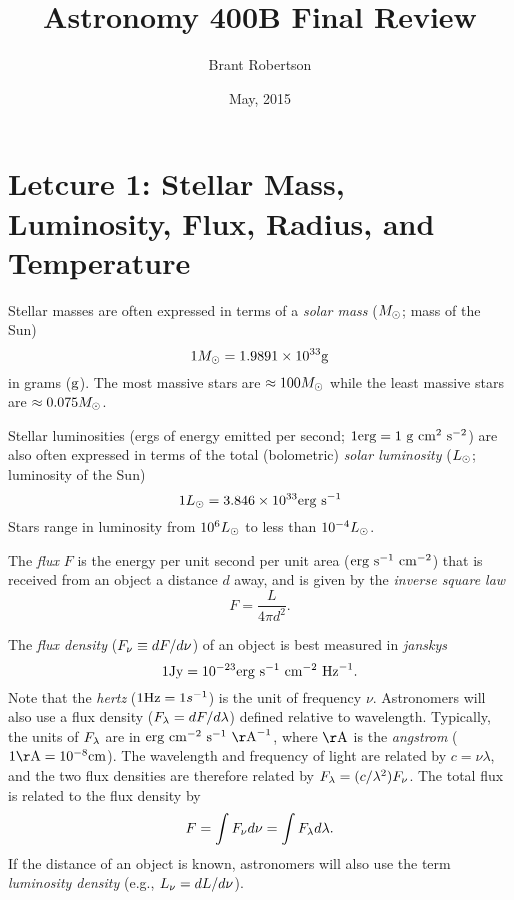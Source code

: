 \documentclass[]{article}
\title{Astronomy 400B Final Review}
\author{Brant Robertson}
\date{May, 2015}
\begin{document}
\maketitle

\section{Letcure 1: Stellar Mass, Luminosity, Flux, Radius, and Temperature}
Stellar masses are often expressed in terms of a {\it solar mass} ($M_{\odot}$; mass of the Sun)
\begin{equation}
1M_{\odot} = 1.9891\times10^{33}\mathrm{g}
\end{equation}
\noindent
in grams ($\mathrm{g}$). The most massive stars are $\approx100M_{\odot}$ while the
least massive stars are $\approx0.075M_{\odot}$.

Stellar luminosities (ergs of energy emitted per second; $1\mathrm{erg} = 1~\mathrm{g}~\mathrm{cm}^{2}~\mathrm{s}^{-2}$) are also 
often expressed in terms of the total (bolometric) {\it solar luminosity} ($L_{\odot}$; luminosity of the Sun)
\begin{equation}
1L_{\odot} = 3.846\times10^{33} \mathrm{erg}~\mathrm{s}^{-1}
\end{equation}
\noindent
Stars range in luminosity from $10^{6}L_{\odot}$ to less than $10^{-4}L_{\odot}$.

The {\it flux} $F$ is the energy per unit second per unit area ($\mathrm{erg}~\mathrm{s}^{-1}~\mathrm{cm}^{-2}$)
that is received from an object a distance $d$ away, and is
given by the {\it inverse square law}
\begin{equation}
\label{eqn:inverse_square}
F = \frac{L}{4\pi d^{2}}.
\end{equation}
\noindent

The {\it flux density} ($F_{\nu} \equiv dF/d\nu$) of an object is best measured in {\it janskys}
\begin{equation}
1\mathrm{Jy} = 10^{-23} \mathrm{erg}~\mathrm{s}^{-1}~\mathrm{cm}^{-2}~\mathrm{Hz}^{-1}.
\end{equation}
\noindent
Note that the {\it hertz} ($1\mathrm{Hz} = 1 s^{-1}$) is the unit of frequency $\nu$.
Astronomers will also use a flux density ($F_{\lambda} = dF/d\lambda$) 
defined relative to wavelength. Typically, the units of $F_{\lambda}$
are in $\erg~\cm^{-2}~\s^{-1}~\Ang^{-1}$, where $\Ang$ is the {\it angstrom}
($1\Ang = 10^{-8}\cm$). The wavelength and frequency of light are related by
$c = \nu \lambda$, and the two flux densities are therefore 
related by $F_{\lambda} = (c/\lambda^2)F_{\nu}$.
The total flux is related to the flux density by
\begin{equation}
F = \int F_{\nu} d \nu = \int F_{\lambda} d\lambda.
\end{equation}
\noindent
If the distance of an object is known, astronomers will also use the term
{\it luminosity density} (e.g., $L_{\nu} = dL/d\nu$).
\end{document}

